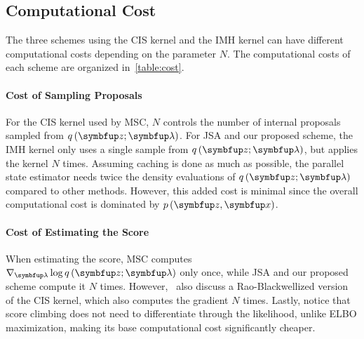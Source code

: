 \begin{wraptable}{r}{0.6\textwidth}
  \vspace{-0.7in}
  
  \vspace{-0.3in}
\end{wraptable}
%
\subsection{Computational Cost}
The three schemes using the CIS kernel and the IMH kernel can have different computational costs depending on the parameter \(N\).
The computational costs of each scheme are organized in~\cref{table:cost}.

\vspace{-0.05in}
\paragraph{Cost of Sampling Proposals}
For the CIS kernel used by MSC, \(N\) controls the number of internal proposals sampled from \(q\,(\vz; \vlambda)\).
For JSA and our proposed scheme, the IMH kernel only uses a single sample from \(q\,(\vz; \vlambda)\), but applies the kernel \(N\) times.
Assuming caching is done as much as possible, the parallel state estimator needs twice the density evaluations of \(q\,(\vz; \vlambda)\) compared to other methods.
However, this added cost is minimal since the overall computational cost is dominated by  \(p\,(\vz,\vx)\).

\vspace{-0.05in}
\paragraph{Cost of Estimating the Score}
When estimating the score, MSC computes \(\nabla_{\vlambda} \log q\,(\vz; \vlambda)\) only once, while JSA and our proposed scheme compute it \(N\) times.
However,~\cite{NEURIPS2020_b2070693} also discuss a Rao-Blackwellized version of the CIS kernel, which also computes the gradient \(N\) times.
Lastly, notice that score climbing does not need to differentiate through the likelihood, unlike ELBO maximization, making its base computational cost significantly cheaper.

